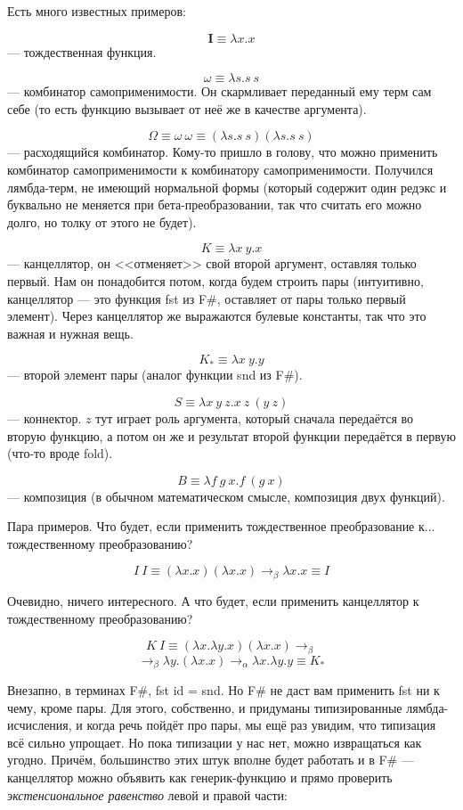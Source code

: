 \documentclass[a5paper]{article}
\begin{document}
Есть много известных примеров:

$$\textbf{I} \equiv \lambda x.x$$
--- тождественная функция.

$$\omega \equiv \lambda s.s\ s$$
--- комбинатор самоприменимости. Он скармливает переданный ему терм сам себе (то есть функцию вызывает от неё же в качестве аргумента).

$$\Omega \equiv \omega\ \omega \equiv (\lambda s.s\ s) (\lambda s.s\ s)$$
--- расходящийся комбинатор. Кому-то пришло в голову, что можно применить комбинатор самоприменимости к комбинатору самоприменимости. Получился лямбда-терм, не имеющий нормальной формы (который содержит один редэкс и буквально не меняется при бета-преобразовании, так что считать его можно долго, но толку от этого не будет).

$$K \equiv \lambda x\ y.x$$
--- канцеллятор, он <<отменяет>> свой второй аргумент, оставляя только первый. Нам он понадобится потом, когда будем строить пары (интуитивно, канцеллятор --- это функция fst из F\#, оставляет от пары только первый элемент). Через канцеллятор же выражаются булевые константы, так что это важная и нужная вещь.

$$K_\ast \equiv \lambda x\ y.y$$
--- второй элемент пары (аналог функции snd из F\#).

$$S \equiv \lambda x\ y\ z. x\ z\ (y\ z)$$
--- коннектор. $z$ тут играет роль аргумента, который сначала передаётся во вторую функцию, а потом он же и результат второй функции передаётся в первую (что-то вроде fold).

$$B \equiv \lambda f\ g\ x. f\ (g\ x)$$
--- композиция (в обычном математическом смысле, композиция двух функций).

Пара примеров. Что будет, если применить тождественное преобразование к... тождественному преобразованию?

$$I\ I \equiv (\lambda x.x) (\lambda x.x) \rightarrow_\beta \lambda x.x \equiv I$$

Очевидно, ничего интересного. А что будет, если применить канцеллятор к тождественному преобразованию?

$$K\ I \equiv (\lambda x.\lambda y.x) (\lambda x.x) \rightarrow_\beta $$
$$\rightarrow_\beta \lambda y.(\lambda x.x) \rightarrow_\alpha \lambda x.\lambda y.y \equiv K_\ast$$

Внезапно, в терминах F\#, fst id = snd. Но F\# не даст вам применить fst ни к чему, кроме пары. Для этого, собственно, и придуманы типизированные лямбда-исчисления, и когда речь пойдёт про пары, мы ещё раз увидим, что типизация всё сильно упрощает. Но пока типизации у нас нет, можно извращаться как угодно. Причём, большинство этих штук вполне будет работать и в F\# --- канцеллятор можно объявить как генерик-функцию и прямо проверить \textit{экстенсиональное равенство} левой и правой части:
\end{document}
